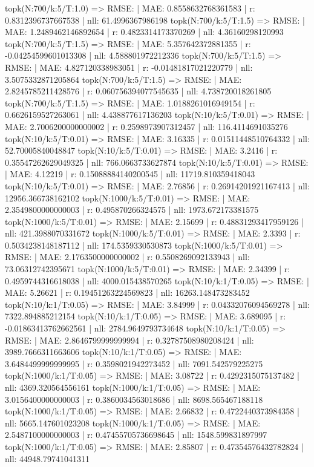 topk(N:700/k:5/T:1.0) => RMSE: | MAE: 0.8558632768361583 | r: 0.8312396737667538 | nll: 61.4996367986198
topk(N:700/k:5/T:1.5) => RMSE: | MAE: 1.2489462146892654 | r: 0.4823314173370269 | nll: 4.36160298120993
topk(N:700/k:5/T:1.5) => RMSE: | MAE: 5.357642372881355 | r: -0.04254599601013308 | nll: 4.588801972212336
topk(N:700/k:5/T:1.5) => RMSE: | MAE: 4.827120338983051 | r: -0.01481817021220779 | nll: 3.5075332871205864
topk(N:700/k:5/T:1.5) => RMSE: | MAE: 2.8245785211428576 | r: 0.060756394077545635 | nll: 4.738720018261805
topk(N:700/k:5/T:1.5) => RMSE: | MAE: 1.0188261016949154 | r: 0.6626159527263061 | nll: 4.438877617136203
topk(N:10/k:5/T:0.01) => RMSE: | MAE: 2.7006200000000002 | r: 0.2598973907312457 | nll: 116.4114691035276
topk(N:10/k:5/T:0.01) => RMSE: | MAE: 3.16335 | r: 0.01511448510764332 | nll: 52.70005840048847
topk(N:10/k:5/T:0.01) => RMSE: | MAE: 3.2416 | r: 0.35547262629049325 | nll: 766.0663733627874
topk(N:10/k:5/T:0.01) => RMSE: | MAE: 4.12219 | r: 0.15088884140200545 | nll: 11719.810359418043
topk(N:10/k:5/T:0.01) => RMSE: | MAE: 2.76856 | r: 0.26914201921167413 | nll: 12956.366738162102
topk(N:1000/k:5/T:0.01) => RMSE: | MAE: 2.3549800000000003 | r: 0.495870266324575 | nll: 1973.672173381575
topk(N:1000/k:5/T:0.01) => RMSE: | MAE: 2.15699 | r: 0.48831293417959126 | nll: 421.3988070331672
topk(N:1000/k:5/T:0.01) => RMSE: | MAE: 2.3393 | r: 0.5034238148187112 | nll: 174.5359330530873
topk(N:1000/k:5/T:0.01) => RMSE: | MAE: 2.1763500000000002 | r: 0.5508269092133943 | nll: 73.06312742395671
topk(N:1000/k:5/T:0.01) => RMSE: | MAE: 2.34399 | r: 0.4959744316618038 | nll: 4000.015438570265
topk(N:10/k:1/T:0.05) => RMSE: | MAE: 5.26621 | r: 0.19451263224569823 | nll: 16263.148473283452
topk(N:10/k:1/T:0.05) => RMSE: | MAE: 3.84999 | r: 0.04332076094569278 | nll: 7322.894885212154
topk(N:10/k:1/T:0.05) => RMSE: | MAE: 3.689095 | r: -0.01863413762662561 | nll: 2784.9649793734648
topk(N:10/k:1/T:0.05) => RMSE: | MAE: 2.8646799999999994 | r: 0.32787508980208424 | nll: 3989.7666311663606
topk(N:10/k:1/T:0.05) => RMSE: | MAE: 3.6484499999999995 | r: 0.3598021942273452 | nll: 7091.542579225275
topk(N:1000/k:1/T:0.05) => RMSE: | MAE: 3.08722 | r: 0.4292315075137482 | nll: 4369.320564556161
topk(N:1000/k:1/T:0.05) => RMSE: | MAE: 3.0156400000000003 | r: 0.3860034563018686 | nll: 8698.565467188118
topk(N:1000/k:1/T:0.05) => RMSE: | MAE: 2.66832 | r: 0.4722440373984358 | nll: 5665.147601023208
topk(N:1000/k:1/T:0.05) => RMSE: | MAE: 2.5487100000000003 | r: 0.47455705736698645 | nll: 1548.599831897997
topk(N:1000/k:1/T:0.05) => RMSE: | MAE: 2.85807 | r: 0.47354576432782824 | nll: 44948.79741041311
